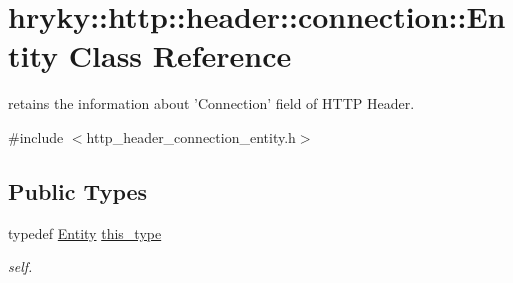 \hypertarget{classhryky_1_1http_1_1header_1_1connection_1_1_entity}{\section{hryky\-:\-:http\-:\-:header\-:\-:connection\-:\-:Entity Class Reference}
\label{classhryky_1_1http_1_1header_1_1connection_1_1_entity}
}


retains the information about 'Connection' field of H\-T\-T\-P Header.  




{\ttfamily \#include $<$http\-\_\-header\-\_\-connection\-\_\-entity.\-h$>$}

\subsection*{Public Types}
\begin{DoxyCompactItemize}
\item 
\hypertarget{classhryky_1_1http_1_1header_1_1connection_1_1_entity_aedaac10cf7686f8bcfd43903ca08cc05}{typedef \hyperlink{classhryky_1_1http_1_1header_1_1connection_1_1_entity}{Entity} \hyperlink{classhryky_1_1http_1_1header_1_1connection_1_1_entity_aedaac10cf7686f8bcfd43903ca08cc05}{this\-\_\-type}}\label{classhryky_1_1http_1_1header_1_1connection_1_1_entity_aedaac10cf7686f8bcfd43903ca08cc05}

\begin{DoxyCompactList}\small\item\em self. \end{DoxyCompactList}\end{DoxyCompactItemize}

